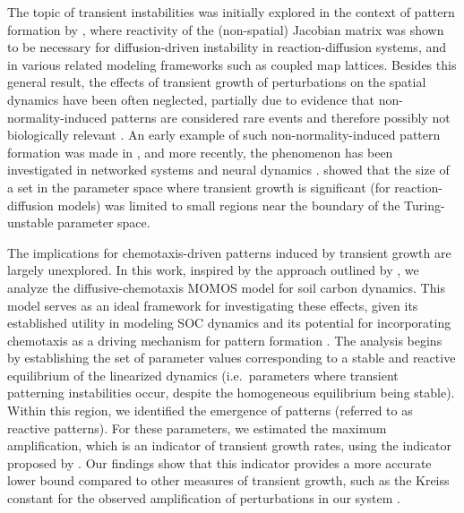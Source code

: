 \documentclass{article}
\begin{document}
The topic of transient instabilities was initially explored in the context of pattern formation by \cite{NEUBERT2002}, where reactivity of the (non-spatial) Jacobian matrix was shown to be necessary for diffusion-driven instability in reaction-diffusion systems, and in various related modeling frameworks such as coupled map lattices. Besides this general result, the effects of transient growth of perturbations on the spatial dynamics have been often neglected, partially due to evidence that non-normality-induced patterns are considered rare events and therefore {possibly not} biologically relevant \cite{klika2017significance}.  {An early example of such non-normality-induced pattern formation was made in \cite{ridolfi2011transient}}, and more recently, the phenomenon has been investigated in networked systems \cite{muolo2019patterns} and neural dynamics \cite{di2018non}.  \cite{klika2017significance} showed that the size of a set in the parameter space where transient growth is significant (for  reaction-diffusion models) was limited to small regions near the boundary of the Turing-unstable parameter space.

The implications for chemotaxis-driven patterns {induced by transient growth are} largely unexplored. In this work, inspired by the approach outlined by \cite{klika2017significance}, we analyze the diffusive-chemotaxis MOMOS model for soil carbon dynamics. This model serves as an ideal framework for investigating these effects, given its established utility in modeling SOC dynamics and its potential for incorporating chemotaxis as a driving mechanism for pattern formation \cite{hammoudi2018mathematical, pansu2010modeling}.
%
%
%
 The analysis begins by establishing the set of parameter values corresponding to a stable and reactive equilibrium of the linearized dynamics {(i.e.~parameters where transient patterning instabilities occur, despite the homogeneous equilibrium being stable}). Within this region, we identified the emergence of patterns (referred to as reactive patterns).
For these parameters, we estimated the maximum amplification{, which is an indicator of transient growth rates,} using the indicator proposed by \cite{klika2017significance}. Our findings show that this indicator provides a more accurate lower bound compared to {other measures of transient growth, such as} the Kreiss constant {for the observed amplification of perturbations in our system} \cite{trefethen2005spectra}.
\end{document}

